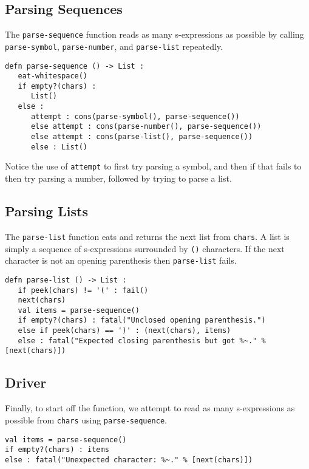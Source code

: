 \documentclass[10pt,oneside]{book}
\begin{document}
\subsection*{Parsing Sequences}
The \texttt{\frenchspacing parse-sequence} function reads as many s-expressions as possible by calling \texttt{\frenchspacing parse-symbol}, \texttt{\frenchspacing parse-number}, and \texttt{\frenchspacing parse-list} repeatedly.
\begin{lstlisting}
defn parse-sequence () -> List :
   eat-whitespace()
   if empty?(chars) :
      List()
   else :
      attempt : cons(parse-symbol(), parse-sequence())
      else attempt : cons(parse-number(), parse-sequence())
      else attempt : cons(parse-list(), parse-sequence())
      else : List()
\end{lstlisting}
Notice the use of \texttt{\frenchspacing attempt} to first try parsing a symbol, and then if that fails to then try parsing a number, followed by trying to parse a list. 

\subsection*{Parsing Lists}
The \texttt{\frenchspacing parse-list} function eats and returns the next list from \texttt{\frenchspacing chars}. A list is simply a sequence of s-expressions surrounded by \texttt{\frenchspacing ()} characters. If the next character is not an opening parenthesis then \texttt{\frenchspacing parse-list} fails.
\begin{lstlisting}
defn parse-list () -> List :   
   if peek(chars) != '(' : fail()
   next(chars)
   val items = parse-sequence()
   if empty?(chars) : fatal("Unclosed opening parenthesis.")
   else if peek(chars) == ')' : (next(chars), items)
   else : fatal("Expected closing parenthesis but got %~." % [next(chars)])
\end{lstlisting}

\subsection*{Driver}
Finally, to start off the function, we attempt to read as many s-expressions as possible from \texttt{\frenchspacing chars} using \texttt{\frenchspacing parse-sequence}. 
\begin{lstlisting}
val items = parse-sequence()
if empty?(chars) : items
else : fatal("Unexpected character: %~." % [next(chars)])
\end{lstlisting}
\end{document}
